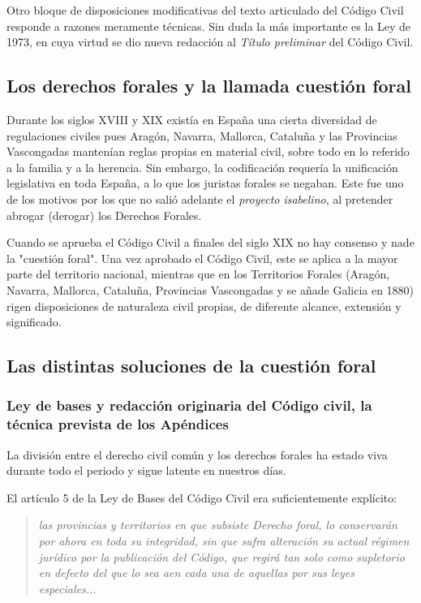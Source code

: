 \documentclass[a4paper,12pt]{report}
\begin{document}
Otro bloque de disposiciones modificativas del texto articulado del Código Civil
responde a razones meramente técnicas. Sin duda la más importante es la Ley de
1973, en cuya virtud se dio nueva redacción al \emph{Título preliminar} del
Código Civil.

\subsection{Los derechos forales y la llamada cuestión foral}

Durante los siglos XVIII y XIX existía en España una cierta diversidad de
regulaciones civiles pues Aragón, Navarra, Mallorca, Cataluña y las Provincias
Vascongadas mantenían reglas propias en material civil, sobre todo en lo
referido a la familia y a la herencia. Sin embargo, la codificación requería la
unificación legislativa en toda España, a lo que los juristas forales se
negaban. Este fue uno de los motivos por los que no salió adelante el
\emph{proyecto isabelino}, al pretender abrogar (derogar) los Derechos Forales.

Cuando se aprueba el Código Civil a finales del siglo XIX no hay consenso y nade
la "cuestión foral". Una vez aprobado el Código Civil, este se aplica a la mayor
parte del territorio nacional, mientras que en los Territorios Forales (Aragón,
Navarra, Mallorca, Cataluña, Provincias Vascongadas y se añade Galicia en 1880)
rigen disposiciones de naturaleza civil propias, de diferente alcance, extensión
y significado.

\subsection{Las distintas soluciones de la cuestión foral}
\subsubsection{Ley de bases y redacción originaria del Código civil, la técnica prevista de los Apéndices}

La división entre el derecho civil común y los derechos forales ha estado viva
durante todo el periodo y sigue latente en nuestros días.

El artículo 5 de la Ley de Bases del Código Civil era suficientemente explícito:

\begin{quote}
    \textit{las provincias y territorios en que subsiste Derecho foral, lo
    conservarán por ahora en toda su integridad, sin que sufra alteración su
actual régimen jurídico por la publicación del Código, que regirá tan solo como
supletorio en defecto del que lo sea aen cada una de aquellas por sus leyes
especiales...}
\end{quote}
\end{document}
